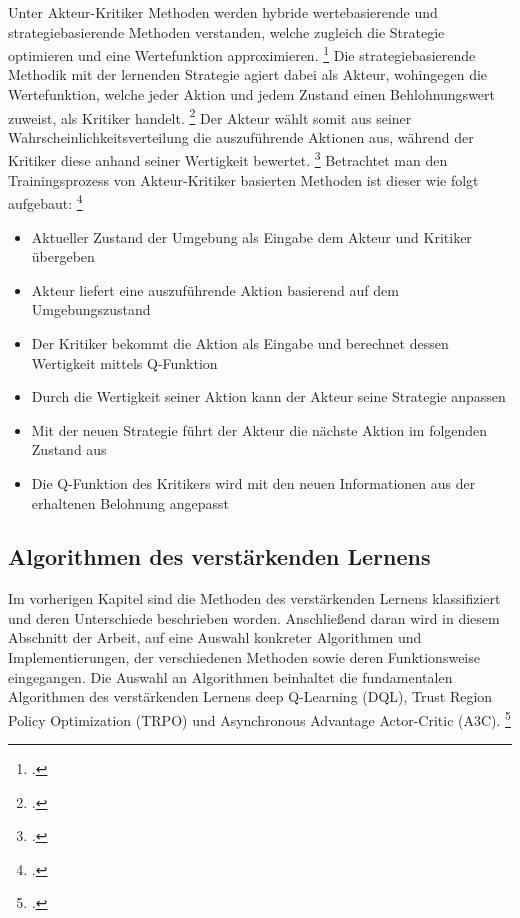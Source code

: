 Unter Akteur-Kritiker Methoden werden hybride wertebasierende und strategiebasierende Methoden verstanden, welche zugleich die Strategie optimieren und eine Wertefunktion approximieren. \footcite[Vgl.][S. 2f.]{Zhang.2018}
Die strategiebasierende Methodik mit der lernenden Strategie agiert dabei als Akteur, wohingegen die Wertefunktion, welche jeder Aktion und jedem Zustand einen Behlohnungswert zuweist, als Kritiker handelt. \footcite[Vgl.][S. 321]{Sutton.2018}
Der Akteur wählt somit aus seiner Wahrscheinlichkeitsverteilung die auszuführende Aktionen aus, während der Kritiker diese anhand seiner Wertigkeit bewertet. \footcite[Vgl.][S. 3]{Ningombam.2022}
Betrachtet man den Trainingsprozess von Akteur-Kritiker basierten Methoden ist dieser wie folgt aufgebaut: \footcite[Vgl.][S. 4]{Ningombam.2022}
\begin{itemize}
    \item Aktueller Zustand der Umgebung als Eingabe dem Akteur und Kritiker übergeben
    \item Akteur liefert eine auszuführende Aktion basierend auf dem Umgebungszustand
    \item Der Kritiker bekommt die Aktion als Eingabe und berechnet dessen Wertigkeit mittels Q-Funktion
    \item Durch die Wertigkeit seiner Aktion kann der Akteur seine Strategie anpassen
    \item Mit der neuen Strategie führt der Akteur die nächste Aktion im folgenden Zustand aus
    \item Die Q-Funktion des Kritikers wird mit den neuen Informationen aus der erhaltenen Belohnung angepasst
\end{itemize}

\subsection{Algorithmen des verstärkenden Lernens}
Im vorherigen Kapitel sind die Methoden des verstärkenden Lernens klassifiziert und deren Unterschiede beschrieben worden.
Anschließend daran wird in diesem Abschnitt der Arbeit, auf eine Auswahl konkreter Algorithmen und Implementierungen, der verschiedenen Methoden sowie deren Funktionsweise eingegangen.
Die Auswahl an Algorithmen beinhaltet die fundamentalen Algorithmen des verstärkenden Lernens deep Q-Learning (DQL), Trust Region Policy Optimization (TRPO) und Asynchronous Advantage Actor-Critic (A3C). \footcite[Vgl.][S. 1]{Arulkumaran.2017}

